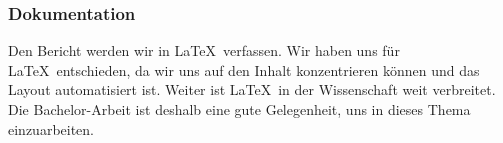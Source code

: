 \subsubsection*{Dokumentation}
Den Bericht werden wir in \LaTeX\ verfassen. Wir haben uns für \LaTeX\ entschieden, da wir uns auf den Inhalt konzentrieren können und das Layout automatisiert ist. Weiter ist \LaTeX\ in der Wissenschaft weit verbreitet. Die Bachelor-Arbeit ist deshalb eine gute Gelegenheit, uns in dieses Thema einzuarbeiten.



